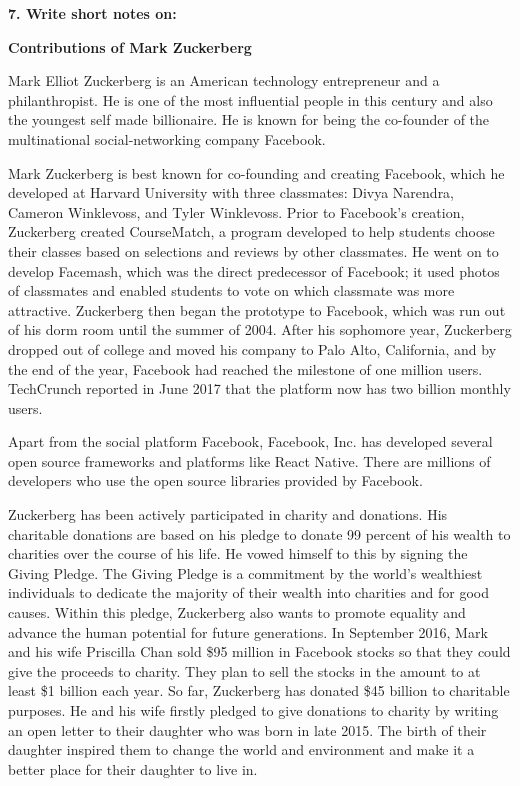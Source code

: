 \documentclass [12pt, a4paper]{article}
\begin{document}
\large
\textbf{7. Write short notes on: }
\normalsize
\begin{center}
	\textbf{Contributions of Mark Zuckerberg}
\end{center}

Mark Elliot Zuckerberg is an American technology entrepreneur and a philanthropist. He is one of the most influential people in this century and also the youngest self made billionaire. He is known for being the co-founder of the multinational social-networking company Facebook.\\
\par
Mark Zuckerberg is best known for co-founding and creating Facebook, which he developed at Harvard University with three classmates: Divya Narendra, Cameron Winklevoss, and Tyler Winklevoss. Prior to Facebook’s creation, Zuckerberg created CourseMatch, a program developed to help students choose their classes based on selections and reviews by other classmates. He went on to develop Facemash, which was the direct predecessor of Facebook; it used photos of classmates and enabled students to vote on which classmate was more attractive. Zuckerberg then began the prototype to Facebook, which was run out of his dorm room until the summer of 2004. After his sophomore year, Zuckerberg dropped out of college and moved his company to Palo Alto, California, and by the end of the year, Facebook had reached the milestone of one million users. TechCrunch reported in June 2017 that the platform now has two billion monthly users.\\
\par
Apart from the social platform Facebook, Facebook, Inc. has developed several open source frameworks and platforms like React Native. There are millions of developers who use the open source libraries provided by Facebook.\\
\par
Zuckerberg has been actively participated in charity and donations. His charitable donations are based on his pledge to donate 99 percent of his wealth to charities over the course of his life. He vowed himself to this by signing the Giving Pledge. The Giving Pledge is a commitment by the world’s wealthiest individuals to dedicate the majority of their wealth into charities and for good causes. Within this pledge, Zuckerberg also wants to promote equality and advance the human potential for future generations. In September 2016, Mark and his wife Priscilla Chan sold \$95 million in Facebook stocks so that they could give the proceeds to charity. They plan to sell the stocks in the amount to at least \$1 billion each year. So far, Zuckerberg has donated \$45 billion to charitable purposes. He and his wife firstly pledged to give donations to charity by writing an open letter to their daughter who was born in late 2015. The birth of their daughter inspired them to change the world and environment and make it a better place for their daughter to live in.\\
\end{document}
